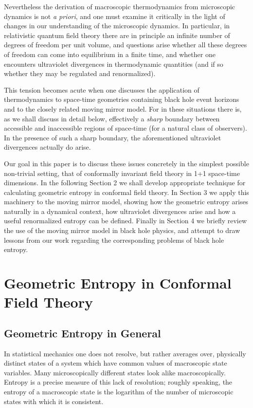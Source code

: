 Nevertheless the derivation of macroscopic thermodynamics from microscopic
dynamics is not {\it a priori}, and one must examine it critically in the
light of changes in our understanding of the microscopic dynamics.
In particular, in relativistic
quantum field theory there are in principle an infinite number of
degrees of freedom per unit volume, and questions arise whether all these
degrees of freedom can come into equilibrium in a finite time, and whether
one encounters ultraviolet divergences in thermodynamic quantities
(and if so whether they may be
regulated and renormalized).


This tension becomes acute when one discusses the application of
thermodynamics to space-time geometries containing
black hole event horizons  and to
the closely related moving mirror
model.   For in these situations there is, as we shall discuss in detail
below, effectively a {\it sharp\/} boundary between accessible and
inaccessible regions of space-time (for a natural class of observers).
In the presence of
such a sharp boundary, the aforementioned ultraviolet
divergences actually do arise.

Our goal in this paper is to discuss these issues concretely in the
simplest possible non-trivial setting, that of conformally invariant
field theory in 1+1 space-time dimensions.
In the following Section 2 we shall
develop appropriate technique for calculating geometric entropy in
conformal field theory.  In Section 3 we apply this machinery to the
moving mirror model, showing how the geometric entropy arises naturally
in a dynamical context, how ultraviolet divergences arise and how a
useful renormalized entropy can be defined.  Finally in Section 4 we
briefly review the use of the moving mirror
model in black hole physics, and attempt to draw lessons from our work
regarding the corresponding problems of black hole entropy.

\chapter{Geometric Entropy in Conformal Field Theory}

\section{Geometric Entropy in General}

In statistical mechanics one does not resolve, but rather
averages over,
physically distinct states of a system
which have common values of macroscopic state
variables.
Many
microscopically different states look alike macroscopically.
Entropy is a precise measure of this lack of resolution; roughly speaking,
the entropy of a macroscopic state
is the logarithm of the number of microscopic states with which it is
consistent.

